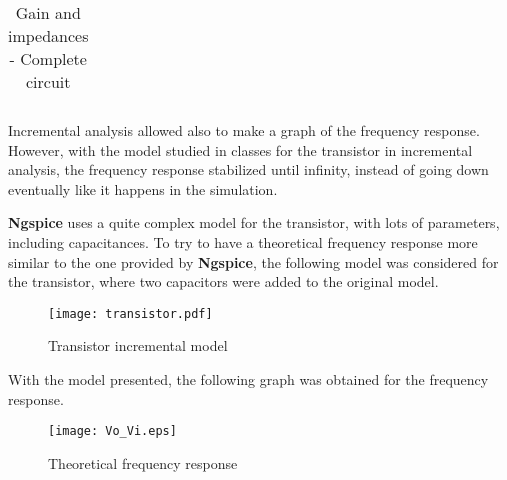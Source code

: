\begin{table}[H]
  \centering
  \begin{tabular}{|c|c|}
    \hline
        
        \hline
  \end{tabular}
  \caption{Gain and impedances - Complete circuit}
  \label{gaintotal}
\end{table}

Incremental analysis allowed also to make a graph of the frequency response. However, with the model studied in classes for the transistor in incremental analysis, the frequency response stabilized until infinity, instead of going down eventually like it happens in the simulation.

{\bf Ngspice} uses a quite complex model for the transistor, with lots of parameters, including capacitances. To try to have a theoretical frequency response more similar to the one provided by {\bf Ngspice}, the following model was considered for the transistor, where two capacitors were added to the original model. 

\begin{figure}[H]
        \centering
        \texttt{[image: transistor.pdf]}
        \caption{Transistor incremental model}
        \label{transistorinc}
\end{figure}

With the model presented, the following graph was obtained for the frequency response.

\begin{figure}[H]
  \centering
  \texttt{[image: Vo\_Vi.eps]}
  \caption{Theoretical frequency response}
  \label{fig:frequencyresp}
\end{figure}
